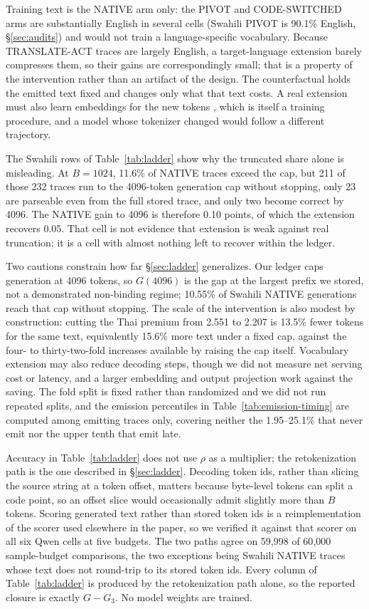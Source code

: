 \documentclass[11pt]{article}
\begin{document}
Training text is the NATIVE arm only: the PIVOT and CODE-SWITCHED arms are
substantially English in several cells (Swahili PIVOT is 90.1\% English,
\S\ref{sec:audits}) and would not train a language-specific vocabulary. Because
TRANSLATE-ACT traces are largely English, a target-language extension barely
compresses them, so their gains are correspondingly small; that is a property
of the intervention rather than an artifact of the design. The counterfactual
holds the emitted text fixed and changes only what that text costs. A real
extension must also learn embeddings for the new tokens
\citep{chinesellama,swallow,focus}, which is itself a training procedure, and a
model whose tokenizer changed would follow a different trajectory.

The Swahili rows of Table~\ref{tab:ladder} show why the truncated share alone
is misleading. At \(B=1024\), 11.6\% of NATIVE traces exceed the cap, but 211
of those 232 traces run to the 4096-token generation cap without stopping, only
23 are parseable even from the full stored trace, and only two become correct
by 4096. The NATIVE gain to 4096 is therefore 0.10 points, of which the
extension recovers 0.05. That cell is not evidence that extension is weak
against real truncation; it is a cell with almost nothing left to recover
within the ledger.

Two cautions constrain how far \S\ref{sec:ladder} generalizes. Our ledger caps
generation at 4096 tokens, so \(G(4096)\) is the gap at the largest prefix we
stored, not a demonstrated non-binding regime; 10.55\% of Swahili NATIVE
generations reach that cap without stopping. The scale of the intervention is
also modest by construction: cutting the Thai premium from 2.551 to 2.207 is
13.5\% fewer tokens for the same text, equivalently 15.6\% more text under a
fixed cap, against the four- to thirty-two-fold increases available by raising
the cap itself. Vocabulary extension may also reduce decoding steps, though we
did not measure net serving cost or latency, and a larger embedding and output
projection work against the saving. The fold split is fixed rather than
randomized and we did not run repeated splits, and the emission percentiles
in Table~\ref{tab:emission-timing} are computed among emitting traces only, covering
neither the 1.95--25.1\% that never emit nor the upper tenth that emit late.

Accuracy in Table~\ref{tab:ladder} does not use \(\rho\) as a multiplier; the
retokenization path is the one described in \S\ref{sec:ladder}.
Decoding token ids, rather than slicing the source string at a token offset,
matters because byte-level tokens can split a code point, so an offset slice
would occasionally admit slightly more than \(B\) tokens. Scoring generated
text rather than stored token ids is a reimplementation of the scorer used
elsewhere in the paper, so we verified it against that scorer on all six Qwen
cells at five budgets. The two paths agree on 59{,}998 of 60{,}000
sample-budget comparisons, the two exceptions being Swahili NATIVE traces whose
text does not round-trip to its stored token ids. Every column of
Table~\ref{tab:ladder} is produced by the retokenization path alone, so the
reported closure is exactly \(G-G_3\). No model weights are trained.
\end{document}
